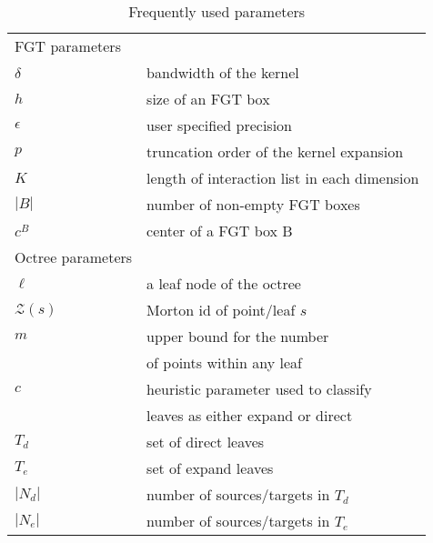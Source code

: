  
\begin{table}[ht!]
\small
\caption{\label{t:notation} Frequently used parameters}
\begin{tabular}{|ll|}
\hline 
FGT parameters &\\
$\delta$                    & bandwidth of the kernel\\
$h$                         & size of an FGT box \\
$\epsilon$                  & user specified precision\\
$p$                         & truncation order of the kernel expansion \\
$K$                         & length of interaction list in each dimension \\
$|B|$                       & number of non-empty FGT boxes \\
$c^B$                       & center of a FGT box B \\
\hline 
Octree parameters &\\
$\ell$                       & a leaf node of the octree \\
$\mathcal{Z}(s)$            & Morton id of point/leaf $s$ \\
$m$                         & upper bound for the number \\ 
                            & of points within any leaf \\
$c$                          & heuristic parameter used to classify \\
                            & leaves as either expand or direct \\
$T_d$                       & set of direct leaves \\
$T_e$                       & set of expand leaves \\ 
$|N_d|$                     & number of sources/targets in $T_d$ \\ 
$|N_e|$                     & number of sources/targets in $T_e$ \\ 
\hline
\end{tabular}
\end{table}

